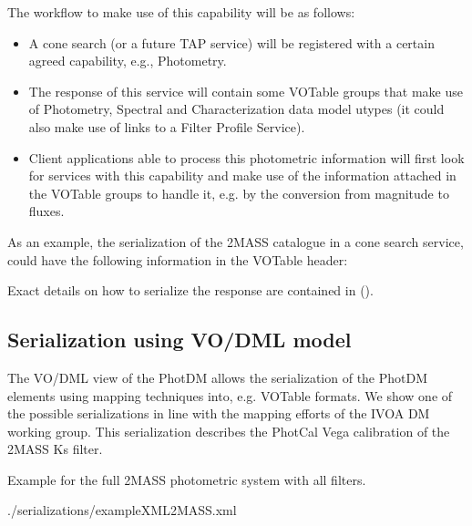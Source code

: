 \documentclass[11pt,a4paper]{ivoa}
\begin{document}
\begin{appendices}
The workflow to make use of this capability will be as follows:
\par

\begin{itemize}
	\item{A cone search (or a future TAP service) will be registered with a 
	certain agreed capability, e.g., Photometry.\par}

	\item{The response of this service will contain some VOTable groups that 
	make use of Photometry, Spectral and Characterization data model utypes 
	(it could also make use of links to a Filter Profile Service).\par}

	\item{Client applications able to process this photometric information 
	will first look for services with this capability and make use of the 
	information attached in the VOTable groups to handle it, e.g. by the 
	conversion from magnitude to fluxes.}
\end{itemize}\par

As an example, the serialization of the 2MASS catalogue in a cone search service, 
could have the following information in the VOTable header:
\par


Exact details on how to serialize the response are contained in (\citep{derriere}).

\subsection{Serialization using VO/DML model} \label{appendixmapping}
The VO/DML view of the PhotDM allows the serialization of the PhotDM elements 
using mapping techniques into, e.g. VOTable formats. We show one of the possible 
serializations in line with the mapping efforts of the IVOA DM working group. 
This serialization describes the PhotCal Vega calibration of the 2MASS Ks filter.
\par 



 Example for the full 2MASS photometric system with all filters.
 

{./serializations/exampleXML2MASS.xml}

\end{appendices}


\end{document}
